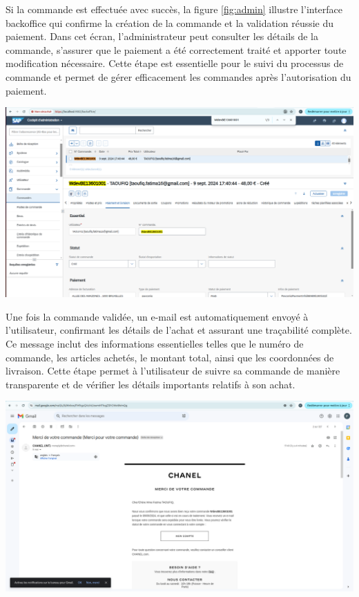 Si la commande est effectuée avec succès, la figure \ref{fig:admin} illustre l'interface backoffice qui confirme la création de la commande et la validation réussie du paiement. Dans cet écran, l'administrateur peut consulter les détails de la commande, s'assurer que le paiement a été correctement traité et apporter toute modification nécessaire. Cette étape est essentielle pour le suivi du processus de commande et permet de gérer efficacement les commandes après l'autorisation du paiement.
\begin{center}
    \centering
    \includegraphics[width=19cm]{Figures/Screens/Backoffice commande.png}
    \label{fig:admin}
\end{center}
Une fois la commande validée, un e-mail est automatiquement envoyé à l'utilisateur, confirmant les détails de l'achat et assurant une traçabilité complète. Ce message inclut des informations essentielles telles que le numéro de commande, les articles achetés, le montant total, ainsi que les coordonnées de livraison. Cette étape permet à l'utilisateur de suivre sa commande de manière transparente et de vérifier les détails importants relatifs à son achat.
\begin{center}
    \centering
    \includegraphics[width=19cm]{Figures/Screens/confirmation par mail.png}
    \label{fig:email}
\end{center}
